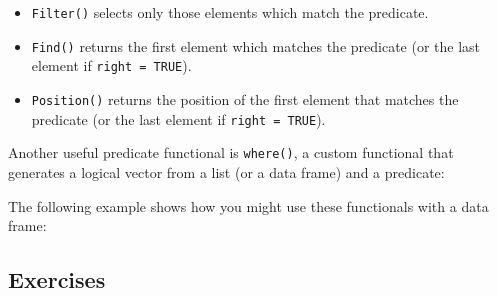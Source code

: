 \begin{itemize}
\item
  \texttt{Filter()} selects only those elements which match the
  predicate. 
\item
  \texttt{Find()} returns the first element which matches the predicate
  (or the last element if \texttt{right = TRUE}). 
\item
  \texttt{Position()} returns the position of the first element that
  matches the predicate (or the last element if \texttt{right = TRUE}).
\end{itemize}

Another useful predicate functional is \texttt{where()}, a custom
functional that generates a logical vector from a list (or a data frame)
and a predicate: 

\begin{Shaded}
\begin{Highlighting}[]
\StringTok{ }
  \NormalTok{(}\NormalTok{))}
\NormalTok{\}}
\end{Highlighting}
\end{Shaded}

The following example shows how you might use these functionals with a
data frame:

\begin{Shaded}
\begin{Highlighting}[]
\StringTok{ }\NormalTok{(} \NormalTok{:}\NormalTok{, } \NormalTok{(}\NormalTok{, }\NormalTok{, }\NormalTok{))}
\NormalTok{(}
\NormalTok{(}
\end{Highlighting}
\end{Shaded}

\subsection{Exercises}

